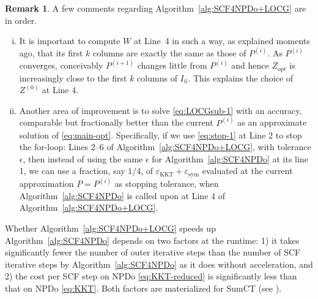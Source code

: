 \documentclass[11pt]{article}
\DeclareMathOperator*{\opt}{opt}
\DeclareMathOperator{\sym}{sym}
\DeclareMathOperator{\KKT}{KKT}
\theoremstyle{definition}
\newtheorem{remark}{Remark}[section]
\numberwithin{equation}{section}
\begin{document}
\begin{remark}\label{rk:SCF4NPDo+LOCG}
A few  comments regarding Algorithm~\ref{alg:SCF4NPDo+LOCG} are in order.
\begin{enumerate}[(i)]
  \item It is important to compute $W$ at Line~4 in such a way, as explained moments ago, that its first $k$ columns are exactly the same as those of $P^{(i)}$.
        As $P^{(i)}$ converges, conceivably $P^{(i+1)}$ changes little from $P^{(i)}$ and hence $Z_{\opt}$
        is increasingly close to the first $k$ columns of $I_{\hat n}$. This explains the choice of $Z^{(0)}$
        at Line 4.
%
  \item Another area of improvement is to solve \eqref{eq:LOCGsub-1} with an accuracy, comparable but fractionally better than the
        current $P^{(i)}$ as an approximate solution of \eqref{eq:main-opt}.  Specifically, if we use
        \eqref{eq:stop-1} at Line 2 to stop the for-loop: Lines 2--6 of  Algorithm~\ref{alg:SCF4NPDo+LOCG}, with tolerance $\epsilon$, then instead of using the same
        $\epsilon$ for Algorithm~\ref{alg:SCF4NPDo} at its line 1,
        we can use a fraction, say $1/4$,
        of $\varepsilon_{\KKT}+\varepsilon_{\sym}$ evaluated at the current approximation $P=P^{(i)}$
        as stopping tolerance,
        when Algorithm~\ref{alg:SCF4NPDo} is called upon at Line 4 of Algorithm~\ref{alg:SCF4NPDo+LOCG}.
\end{enumerate}
\end{remark}


Whether Algorithm~\ref{alg:SCF4NPDo+LOCG}
speeds up Algorithm~\ref{alg:SCF4NPDo} depends on two factors at the runtime:
1) it takes significantly fewer the number of outer iterative steps than the number of SCF iterative steps
by Algorithm~\ref{alg:SCF4NPDo} as it does without acceleration, and 2) the cost per SCF step on NPDo \eqref{eq:KKT-reduced} is significantly less than that on NPDo \eqref{eq:KKT}. Both factors are materialized for SumCT (see \cite[Example 4.1]{wazl:2022a}).
\end{document}
